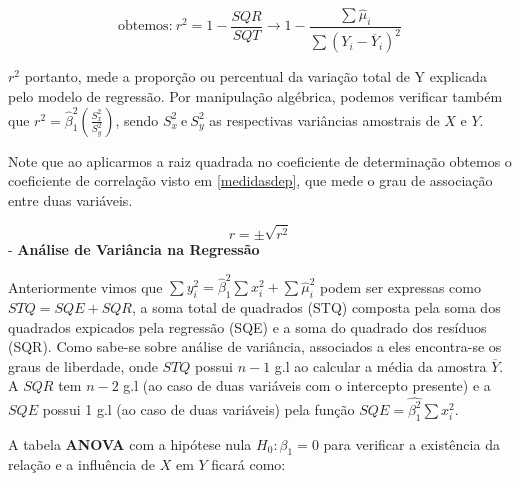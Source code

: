 \documentclass[
  openany]{book}
\begin{document}
\begin{equation}
    \mbox{obtemos:} \ r^2=1-\frac{SQR}{SQT} \rightarrow 1 - \frac{\sum \hat{\mu}_i}{\sum (Y_i - \overline{Y}_i)^2}
    \label{eq:coefdet}
\end{equation}

\(r^2\) portanto, mede a proporção ou percentual da variação total de Y explicada pelo modelo de regressão. Por manipulação algébrica, podemos verificar também que \(r^2=\hat{\beta}^2_1(\frac{S^2_x}{S^2_y})\), sendo \(S^2_x\ \mbox{e} \ S^2_y\) as respectivas variâncias amostrais de \(X\) e \(Y\).

Note que ao aplicarmos a raiz quadrada no coeficiente de determinação obtemos o coeficiente de correlação visto em \ref{medidasdep}, que mede o grau de associação entre duas variáveis.

\[r=\pm \sqrt{r^2}\]
- \textbf{Análise de Variância na Regressão}

Anteriormente vimos que \(\sum y^2_i=\hat{\beta}^2_1 \sum x_i^2+\sum \hat{\mu}^2_i\) podem ser expressas como \(STQ=SQE+SQR\), a soma total de quadrados (STQ) composta pela soma dos quadrados expicados pela regressão (SQE) e a soma do quadrado dos resíduos (SQR). Como sabe-se sobre análise de variância, associados a eles encontra-se os graus de liberdade, onde \(STQ\) possui \(n-1\) g.l ao calcular a média da amostra \(\overline{Y}\). A \(SQR\) tem \(n-2\) g.l (ao caso de duas variáveis com o intercepto presente) e a \(SQE\) possui 1 g.l (ao caso de duas variáveis) pela função \(SQE=\hat{\beta_1^2}\sum x^2_i\).

A tabela \textbf{ANOVA} com a hipótese nula \(H_0: \beta_1=0\) para verificar a existência da relação e a influência de \(X\) em \(Y\) ficará como:
\end{document}
